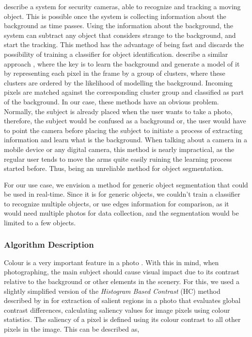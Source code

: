 \citeauthor{yang2004real} \cite{yang2004real} describe a system for security cameras, able to recognize and tracking a moving object. This is possible once the system is collecting information about the background as time passes. Using the information about the background, the system can subtract any object that considers strange to the background, and start the tracking. This method has the advantage of being fast and discards the possibility of training a classifier for object identification. 
\citeauthor{butler2003real} describe a similar approach \cite{butler2003real}, where the key is to learn the background and generate a model of it by representing each pixel in the frame by a group of clusters, where these clusters are ordered by the likelihood of modelling the background. Incoming pixels are matched against the corresponding cluster group and classified as part of the background.
In our case, these methods have an obvious problem. Normally, the subject is already placed when the user wants to take a photo, therefore, the subject would be confused as a background or, the user would have to point the camera before placing the subject to initiate a process of extracting information and learn what is the background. When talking about a  camera in a mobile device or any digital camera, this method is nearly impractical, as the regular user tends to move the arms quite easily ruining the learning process started before. Thus, being an unreliable method for object segmentation.

For our use case, we envision a method for generic object segmentation that could be used in real-time. Since it is for generic objects, we couldn't train a classifier to recognize multiple objects, or use edges information for comparison, as it would need multiple photos for data collection, and the segmentation would be limited to a few objects. 

\subsubsection{Algorithm Description}
\label{subsub:seg_algorithm}

Colour is a very important feature in a photo \cite{kamps2012rules, Santos}. With this in mind, when photographing, the main subject should cause visual impact due to its contrast relative to the background or other elements in the scenery. For this, we used a slightly simplified version of the \emph{Histogram Based Contrast} (HC) method described by \citeauthor{cheng2011global} in \cite{cheng2011global} for extraction of salient regions in a photo that evaluates global contrast differences, calculating saliency values for image pixels using colour statistics. The saliency of a pixel is defined using its colour contrast to all other pixels in the image. This can be described as,

